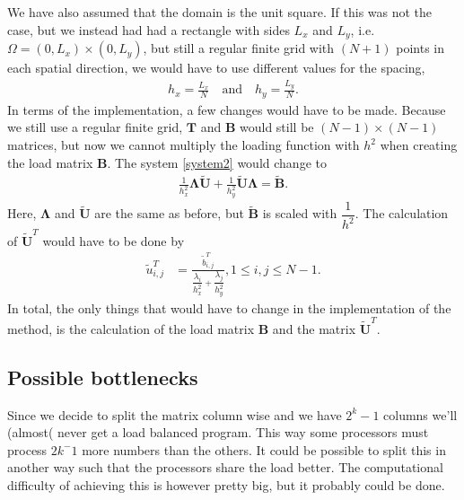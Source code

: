 We have also assumed that the domain is the unit square. If this was not the case, but we instead had had a rectangle with sides $L_x$ and $L_y$, i.e. $ \Omega = (0,L_x)\times (0,L_y)$, but still a regular finite grid with $(N+1)$ points in each spatial direction, we would have to use different values for the spacing, 
\begin{align*}
	h_x = \frac{L_x}{N} \quad \text{and} \quad h_y = \frac{L_y}{N}.
\end{align*}
In terms of the implementation, a few changes would have to be made. Because we still use a regular finite grid, $\mathbf{T}$ and $\mathbf{B}$ would still be $(N-1)\times (N-1)$ matrices, but now we cannot multiply the loading function with $h^2$ when creating the load matrix $\mathbf{B}$. The system \eqref{system2} would change to 
\begin{align*}
	\frac{1}{h_x^2}\mathbf{\Lambda\widetilde{U}} + \frac{1}{h_y^2}\mathbf{\widetilde{U}\Lambda} = \mathbf{\widetilde{B}}.
\end{align*}
Here, $\mathbf{\Lambda}$ and $\mathbf{\widetilde{U}}$ are the same as before, but $\mathbf{\widetilde{B}}$ is scaled with $\dfrac{1}{h^2}$. The calculation of $\mathbf{\widetilde{U}}^T$ would have to be done by
\begin{align*}
	\tilde{u}^T_{i,j} &= \frac{\tilde{b}^T_{i,j}}{\dfrac{\lambda_i}{h_x^2} + \dfrac{\lambda_j}{h_y^2}}, 1 \leq i, j \leq N-1.
\end{align*}
In total, the only things that would have to change in the implementation of the method, is the calculation of the load matrix $\mathbf{B}$ and the matrix $\mathbf{\widetilde{U}}^T$.

\subsection*{Possible bottlenecks}
Since we decide to split the matrix column wise and we have $2^k-1$ columns we'll (almost( never get a load balanced program. This way some processors must process $2k^-1$ more numbers than the others. It could be possible to split this in another way such that the processors share the load better. The computational difficulty of achieving this is however pretty big, but it probably could be done.

